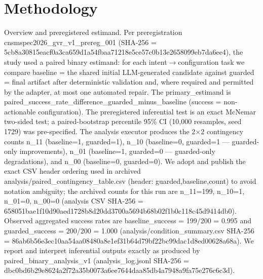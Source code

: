 \documentclass[conference]{IEEEtran}
\begin{document}
\section{Methodology}
Overview and preregistered estimand. Per preregistration cnsmspec2026\_gvr\_v1\_prereg\_001 (SHA-256 = 5cb8a30815eacf0a3ca659d1a54fbaa71218e5ce57c0b13e2658099eb7da6ee4), the study used a paired binary estimand: for each intent\ensuremath{\rightarrow}configuration task we compare baseline = the shared initial LLM-generated candidate against guarded = final artifact after deterministic validation and, where required and permitted by the adapter, at most one automated repair. The primary\_estimand is paired\_success\_rate\_difference\_guarded\_minus\_baseline (success = non-actionable configuration). The preregistered inferential test is an exact McNemar two-sided test; a paired-bootstrap percentile 95\% CI (10,000 resamples, seed 1729) was pre-specified. The analysis executor produces the 2\ensuremath{\times}2 contingency counts n\_11 (baseline=1, guarded=1), n\_10 (baseline=0, guarded=1 --- guarded-only improvements), n\_01 (baseline=1, guarded=0 --- guarded-only degradations), and n\_00 (baseline=0, guarded=0). We adopt and publish the exact CSV header ordering used in archived analysis/paired\_contingency\_table.csv (header: guarded,baseline,count) to avoid notation ambiguity; the archived counts for this run are n\_11=199, n\_10=1, n\_01=0, n\_00=0 (analysis CSV SHA-256 = 658051bae1f10d90aed1728b8d20dd3700a5694b68b02f1b0c118c45d9414db0). Observed aggregated success rates are baseline\_success = 199/200 = 0.995 and guarded\_success = 200/200 = 1.000 (analysis/condition\_summary.csv SHA-256 = 86ab6b56e3ec10aa54aa08480a8e1ef31b64d79bf22bc99dac1d8ed00628a68a). We report and interpret inferential outputs exactly as produced by paired\_binary\_analysis\_v1 (analysis\_log.jsonl SHA-256 = dbc0bd6b29e8624a2f72a35b0073a6ee7644daa85db4a7948a9fa75e276c6c3d).
\end{document}
